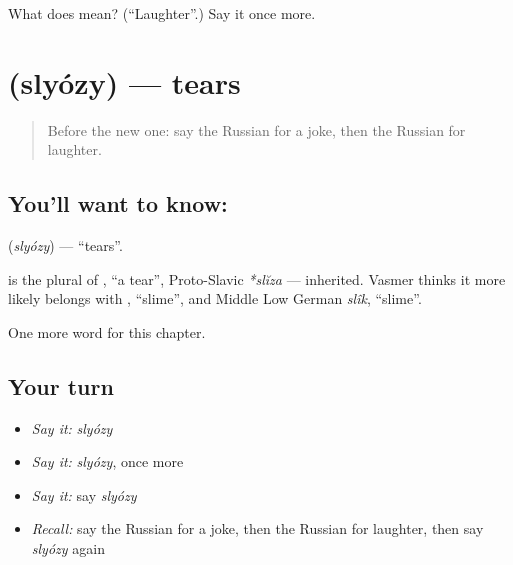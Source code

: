 \begin{tcolorbox}[breakable,colback=teal!4,colframe=teal!35!black,title={Before you move on}]
What does  mean? (\textquotedblleft{}Laughter\textquotedblright{}.) Say it once more.
\end{tcolorbox}
\section[\texorpdfstring{\ru{слёзы} (slyózy)}{слёзы (slyózy)}]{ (slyózy) — tears}

\label{lesson:RU-C200-slyozy}



\begin{quote}
Before the new one: say the Russian for a joke, then the Russian for laughter.
\end{quote}

\subsection*{You'll want to know: }
\textbf{} (\emph{slyózy}) — \textquotedblleft{}tears\textquotedblright{}.

\begin{cousinweb}
\textbf{} is the plural of \emph{}, \textquotedblleft{}a tear\textquotedblright{}, Proto-Slavic \emph{*slĭza} — inherited. Vasmer thinks it more likely belongs with \emph{}, \textquotedblleft{}slime\textquotedblright{}, and Middle Low German \emph{slîk}, \textquotedblleft{}slime\textquotedblright{}.
\end{cousinweb}

\begin{grammarlens}[title={What you've built}]
One more word for this chapter.
\end{grammarlens}

\subsection*{Your turn}
\begin{itemize}
\raggedright
  \item \emph{Say it:} \emph{slyózy}
  \item \emph{Say it:} \emph{slyózy}, once more
  \item \emph{Say it:} say \emph{slyózy}
  \item \emph{Recall:} say the Russian for a joke, then the Russian for laughter, then say \emph{slyózy} again
\end{itemize}

